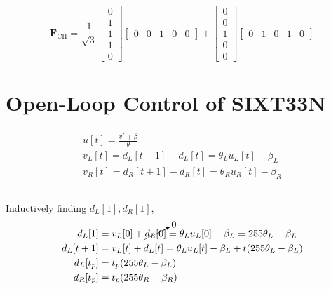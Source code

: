 \documentclass[]{article}
\begin{document}
\subsubsection{}

\begin{equation}
	\bm{F}_{\text{CH}} = \frac{1}{\sqrt{3}} \begin{bmatrix}
	0 \\
	1 \\
	1 \\
	1 \\
	0
	\end{bmatrix} \begin{bmatrix}
	0 & 0 & 1 & 0 & 0
	\end{bmatrix}
	+
	\begin{bmatrix}
	0 \\
	0 \\
	1 \\
	0 \\
	0
	\end{bmatrix} \begin{bmatrix}
	0 & 1 & 0 & 1 & 0
	\end{bmatrix}
\end{equation}

\section{Open-Loop Control of SIXT33N}

\begin{gather}
	u[t] = \frac{v^\ast + \beta}{\theta} \\
	v_L[t] = d_L[t + 1] - d_L[t] = \theta_L u_L[t] - \beta_L \\
	v_R[t] = d_R[t + 1] - d_R[t] = \theta_R u_R[t] - \beta_R
\end{gather}

\subsection{}

Inductively finding \(d_L[1], d_R[1]\),
\begin{align}
	d_L[1] &= v_L[0] + \cancelto{0}{d_L[0]} = \theta_L u_L[0] - \beta_L = 255\theta_L - \beta_L \\
	d_L[t + 1] &= v_L[t] + d_L[t] = \theta_L u_L[t] - \beta_L + t(255\theta_L - \beta_L) \\
	d_L[t_p] &= t_p(255\theta_L - \beta_L) \\
	d_R[t_p] &= t_p(255\theta_R - \beta_R)
\end{align}
\end{document}
